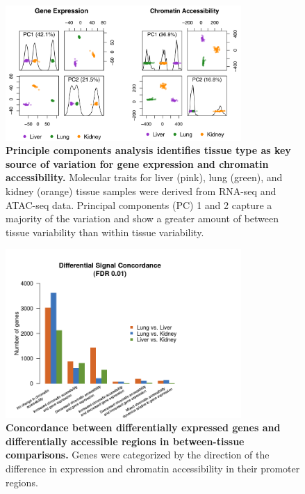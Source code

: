 \documentclass[10pt,letterpaper,twoside]{article}
\begin{document}
\clearpage 

\begin{figure}[hp]
\renewcommand{\familydefault}{\sfdefault}\normalfont
\centering
\includegraphics[width=0.8\textwidth, trim={0in 0in 0in 0in}, clip]{figs/pca_plot.png}
\caption{\textbf{Principle components analysis identifies tissue type as key source of variation for gene expression and chromatin accessibility.} 
Molecular traits for liver (pink), lung (green), and kidney (orange) tissue samples were derived from RNA-seq and ATAC-seq data. Principal components (PC) 1 and 2 capture a majority of the variation and show a greater amount of between tissue variability than within tissue variability. \label{fig:pca_plots}}
\end{figure}

\clearpage

\begin{figure}[hp]
\renewcommand{\familydefault}{\sfdefault}\normalfont
\centering
\includegraphics[width=0.8\textwidth, trim={0in 0in 0in 0in}, clip]{figs/diff_concordance.png}
\caption{\textbf{Concordance between differentially expressed genes and differentially accessible regions in between-tissue comparisons.} 
Genes were categorized by the direction of the difference in expression and chromatin accessibility in their promoter regions.\label{fig:diff_concordance}}
\end{figure}
\end{document}
